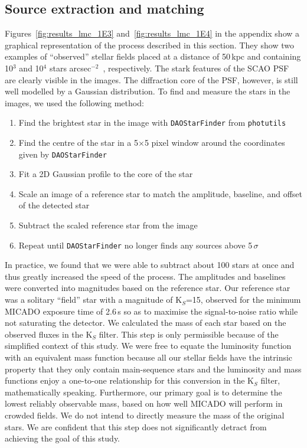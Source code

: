\documentclass{aa}
\newcommand{\sig}{$\sigma$~}
\newcommand{\spa}{stars arcsec$^{-2}$~}
\begin{document}
\subsection{Source extraction and matching}
\label{subsec:source_extraction}

Figures~\ref{fig:results_lmc_1E3} and~\ref{fig:results_lmc_1E4} in the appendix show a graphical representation of the process described in this section.
They show two examples of ``observed'' stellar fields placed at a distance of 50\,kpc and containing 10$^3$ and 10$^4$ \spa , respectively.
The stark features of the SCAO PSF are clearly visible in the images.
The diffraction core of the PSF, however, is still well modelled by a Gaussian distribution.
To find and measure the stars in the images, we used the following method:

\begin{enumerate}
    \item Find the brightest star in the image with \verb+DAOStarFinder+ from \verb+photutils+~\citep{photutils}
    \item Find the centre of the star in a 5$\times$5 pixel window around the coordinates given by \verb+DAOStarFinder+
    \item Fit a 2D Gaussian profile to the core of the star
    \item Scale an image of a reference star to match the amplitude, baseline, and offset of the detected star
    \item Subtract the scaled reference star from the image
    \item Repeat until \verb+DAOStarFinder+ no longer finds any sources above 5\,\sig
\end{enumerate}

In practice, we found that we were able to subtract about 100 stars at once and thus greatly increased the speed of the process.
The amplitudes and baselines were converted into magnitudes based on the reference star.
Our reference star was a solitary ``field'' star with a magnitude of K$_S$=15, observed for the minimum {MICADO} exposure time of 2.6\,s so as to maximise the signal-to-noise ratio while not saturating the detector.
We calculated the mass of each star based on the observed fluxes in the K$_S$ filter.
This step is only permissible because of the simplified context of this study.
We were free to equate the luminosity function with an equivalent mass function because all our stellar fields have the intrinsic property that they only contain main-sequence stars and the luminosity and mass functions enjoy a one-to-one relationship for this conversion in the K$_S$ filter, mathematically speaking.
Furthermore, our primary goal is to determine the lowest reliably observable mass, based on how well MICADO will perform in crowded fields. We do not intend to directly measure the mass of the original stars.
We are confident that this step does not significantly detract from achieving the goal of this study.
\end{document}

